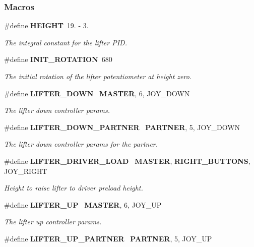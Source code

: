 \subsubsection*{Macros}
\begin{DoxyCompactItemize}
\item 
\#define \textbf{ H\+E\+I\+G\+HT}~19. -\/ 3.
\begin{DoxyCompactList}\small\item\em The integral constant for the lifter P\+ID. \end{DoxyCompactList}\item 
\#define \textbf{ I\+N\+I\+T\+\_\+\+R\+O\+T\+A\+T\+I\+ON}~680
\begin{DoxyCompactList}\small\item\em The initial rotation of the lifter potentiometer at height zero. \end{DoxyCompactList}\item 
\#define \textbf{ L\+I\+F\+T\+E\+R\+\_\+\+D\+O\+WN}~\textbf{ M\+A\+S\+T\+ER}, 6, J\+O\+Y\+\_\+\+D\+O\+WN
\begin{DoxyCompactList}\small\item\em The lifter down controller params. \end{DoxyCompactList}\item 
\#define \textbf{ L\+I\+F\+T\+E\+R\+\_\+\+D\+O\+W\+N\+\_\+\+P\+A\+R\+T\+N\+ER}~\textbf{ P\+A\+R\+T\+N\+ER}, 5, J\+O\+Y\+\_\+\+D\+O\+WN
\begin{DoxyCompactList}\small\item\em The lifter down controller params for the partner. \end{DoxyCompactList}\item 
\#define \textbf{ L\+I\+F\+T\+E\+R\+\_\+\+D\+R\+I\+V\+E\+R\+\_\+\+L\+O\+AD}~\textbf{ M\+A\+S\+T\+ER}, \textbf{ R\+I\+G\+H\+T\+\_\+\+B\+U\+T\+T\+O\+NS}, J\+O\+Y\+\_\+\+R\+I\+G\+HT
\begin{DoxyCompactList}\small\item\em Height to raise lifter to driver preload height. \end{DoxyCompactList}\item 
\#define \textbf{ L\+I\+F\+T\+E\+R\+\_\+\+UP}~\textbf{ M\+A\+S\+T\+ER}, 6, J\+O\+Y\+\_\+\+UP
\begin{DoxyCompactList}\small\item\em The lifter up controller params. \end{DoxyCompactList}\item 
\#define \textbf{ L\+I\+F\+T\+E\+R\+\_\+\+U\+P\+\_\+\+P\+A\+R\+T\+N\+ER}~\textbf{ P\+A\+R\+T\+N\+ER}, 5, J\+O\+Y\+\_\+\+UP

\end{DoxyCompactItemize}
